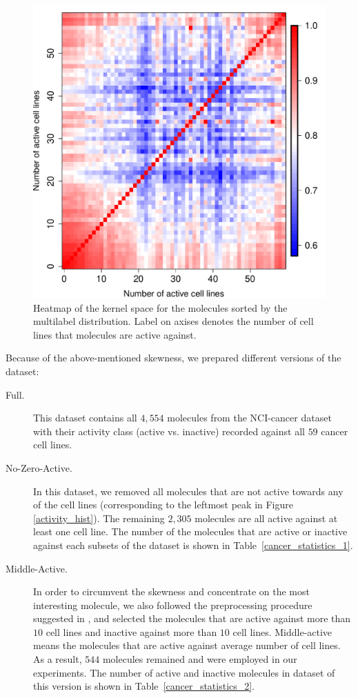 \documentclass[english]{tktltiki}
\begin{document}
\begin{figure}
\begin{center}
\centering
\includegraphics[width=0.6\columnwidth]{./plots/kernel_heatmap.pdf}
\caption[Heatmap of kernel space.]{Heatmap of the kernel space for the molecules sorted by the multilabel distribution. Label on axises denotes the number of cell lines that molecules are active against.}
\label{kernel_heatmap}
\end{center}
\end{figure}

Because of the above-mentioned skewness, we prepared different versions of the dataset:
\begin{description}
  \item[Full.] This dataset contains all $4,554$ molecules from the NCI-cancer dataset with their activity class (active vs. inactive) recorded against all $59$ cancer cell lines.

  \item[No-Zero-Active.] In this dataset, we removed all molecules that are not active towards any of the cell lines (corresponding to the leftmost peak in Figure \ref{activity_hist}). The remaining $2,305$ molecules are all active against at least one cell line. The number of the molecules that are active or inactive against each subsets of the dataset is shown in Table~\ref{cancer_statistics_1}.

  \item[Middle-Active.] In order to circumvent the skewness and concentrate on the most interesting molecule, we also followed the preprocessing procedure suggested in \cite{shivakumar09}, and selected the molecules that are active against more than \(10\) cell lines and inactive against more than \(10\) cell lines. Middle-active means the molecules that are active against average number of cell lines. As a result, \(544\) molecules remained and were employed in our experiments. The number of active and inactive molecules in dataset of this version is shown in Table~\ref{cancer_statistics_2}.
\end{description}
\end{document}
